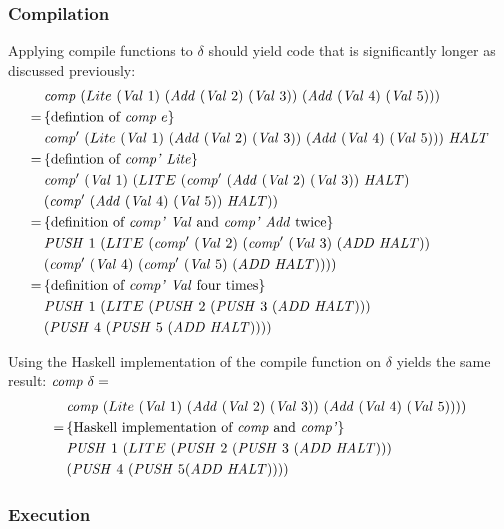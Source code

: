 \documentclass {article}
\begin{document}
\subsubsection{Compilation}

Applying compile functions to $\delta$ should
yield code that is significantly longer as
discussed previously:
\begin{align*}	
&\Comp (Lite\ (\Val 1)\ (\Add (\Val 2)\ (\Val 3))\ 
						(\Add (\Val 4)\ (\Val 5))) \\
=\, & \{ \mbox{defintion of \comp\ $e$} \} \\
&\Compp (Lite\ (\Val 1)\ (\Add (\Val 2)\ (\Val 3))\ 
						(\Add (\Val 4)\ (\Val 5)))\ \HALT \\
=\, & \{ \mbox{defintion of \compp\ \lite} \} \\
&\Compp  (\Val 1)\ (LITE\ (\Compp (\Add (\Val 2)\ (\Val 3))\ \HALT)\\ 
							&(\Compp (\Add (\Val 4)\ (\Val 5))\ \HALT)) \\
=\, & \{ \mbox{definition of \compp\ \val\ and \compp\ \add\ twice}\} \\
&\PUSH 1\ (LITE\ (\Compp  (\Val 2)\ (\Compp  (\Val 3)\ (\ADD  \HALT)) \\
				&(\Compp   (\Val 4)\ (\Compp  (\Val 5)\ (\ADD  \HALT)))) \\
=\, & \{ \mbox{definition of \compp\ \val\ four times} \} \\
&\PUSH 1\ (LITE\ (\PUSH 2\ (\PUSH 3\ (\ADD  \HALT))) \\
			&(\PUSH 4\ (\PUSH 5\ (\ADD  \HALT))))
\end{align*}

Using the Haskell implementation 
of the compile function on $\delta$
yields the same result: \( \mathit{comp\ } \delta = \)
\begin{align*}
&\Comp (Lite\ (\Val 1)\
		 (\Add (\Val 2)\ (\Val 3))\ 
		(\Add (\Val 4)\ (\Val 5)))) \\
=\, & \{ \mbox{Haskell implementation of \comp\ and \compp} \} \\
&\PUSH 1\ (LITE\ (\PUSH 2\ (\PUSH 3\ (\ADD  \HALT))) \\
		&(\PUSH 4\ (\PUSH 5 (\ADD  \HALT))))
\end{align*}

\subsubsection{Execution}
\end{document}
